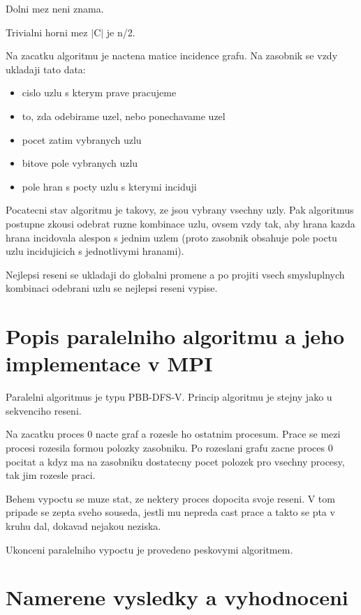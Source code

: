\documentclass[a4paper]{article}
\begin{document}
Dolni mez neni znama.

Trivialni horni mez $|$C$|$ je n/2.

Na zacatku algoritmu je nactena matice incidence grafu. Na zasobnik se vzdy ukladaji tato data:

\begin{itemize}
	\item cislo uzlu s kterym prave pracujeme
	\item to, zda odebirame uzel, nebo ponechavame uzel
	\item pocet zatim vybranych uzlu
	\item bitove pole vybranych uzlu
	\item pole hran s pocty uzlu s kterymi inciduji
\end{itemize}

Pocatecni stav algoritmu je takovy, ze jsou vybrany vsechny uzly. Pak algoritmus postupne zkousi
odebrat ruzne kombinace uzlu, ovsem vzdy tak, aby hrana kazda hrana incidovala alespon
s jednim uzlem (proto zasobnik obsahuje pole poctu uzlu incidujicich s jednotlivymi hranami).

Nejlepsi reseni se ukladaji do globalni promene a po projiti vsech smysluplnych kombinaci
odebrani uzlu se nejlepsi reseni vypise.

\section{Popis paralelniho algoritmu a jeho implementace v MPI}

Paralelni algoritmus je typu PBB-DFS-V. Princip algoritmu je stejny jako u sekvenciho reseni.

Na zacatku proces 0 nacte graf a rozesle ho ostatnim procesum. Prace se mezi procesi
rozesila formou polozky zasobniku. Po rozeslani grafu zacne proces 0 pocitat
a kdyz ma na zasobniku dostatecny pocet polozek pro vsechny procesy,
tak jim rozesle praci.

Behem vypoctu se muze stat, ze nektery proces dopocita svoje reseni. V tom pripade
se zepta sveho souseda, jestli mu nepreda cast prace a takto se pta v kruhu
dal, dokavad nejakou neziska.

Ukonceni paralelniho vypoctu je provedeno peskovymi algoritmem.

\section{Namerene vysledky a vyhodnoceni}
\end{document}
